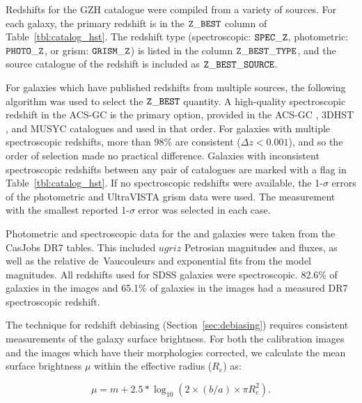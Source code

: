 \documentclass[a4paper,fleqn,usenatbib]{mnras}
\begin{document}
Redshifts for the GZH catalogue were compiled from a variety of sources. For each
galaxy, the primary redshift is in the $\tt Z\_BEST$ column of
Table~\ref{tbl:catalog_hst}. The redshift type (spectroscopic: $\tt SPEC\_Z$,
photometric: $\tt PHOTO\_Z$, or grism: $ \tt GRISM\_Z$) is listed in the column
$\tt Z\_BEST\_TYPE$, and the source catalogue of the redshift is included as $\tt
Z\_BEST\_SOURCE$. 

For galaxies which have published redshifts from multiple sources, the
following algorithm was used to select the $\tt Z\_BEST$ quantity. A
high-quality spectroscopic redshift in the ACS-GC is the primary option,
provided in the ACS-GC \citep{gri12}, 3DHST \citep{mom15}, and MUSYC
\citep{car10} catalogues and used in that order. For galaxies with multiple
spectroscopic redshifts, more than 98\% are consistent ($\Delta z<0.001$), and
so the order of selection made no practical difference. Galaxies with
inconsistent spectroscopic redshifts between any pair of catalogues are marked
with a flag in Table~\ref{tbl:catalog_hst}.  If no spectroscopic redshifts were
available, the 1-$\sigma$ errors of the photometric \citep[ACS-GC, 3DHST,
MUSYC, UltraVISTA;][]{ilb13} and UltraVISTA grism data were used. The
measurement with the smallest reported 1-$\sigma$ error was selected in each
case.
 
%

Photometric and spectroscopic data for the \stripe{} and \coadd{} galaxies were taken
from the CasJobs DR7 tables. This included $ugriz$ Petrosian magnitudes and
fluxes, as well as the relative de~Vaucouleurs and exponential fits from the
model magnitudes. All redshifts used for SDSS galaxies were spectroscopic.
82.6\% of galaxies in the \stripe{} images and 65.1\% of galaxies in the
\coadd{} images had a measured DR7 spectroscopic redshift. 

The technique for redshift debiasing (Section~\ref{sec:debiasing}) requires
consistent measurements of the galaxy surface brightness. For both the
\redshifted{} calibration images and the \hst{} images which have their
morphologies corrected, we calculate the mean surface brightness $\mu$ within the
effective radius ($R_e$) as:

\begin{equation}
\mu = m + 2.5*\log_{10}{(2 \times (b/a) \times \pi R_e^2 )}.
\label{eqn:surface_brightness}
\end{equation}
\end{document}
